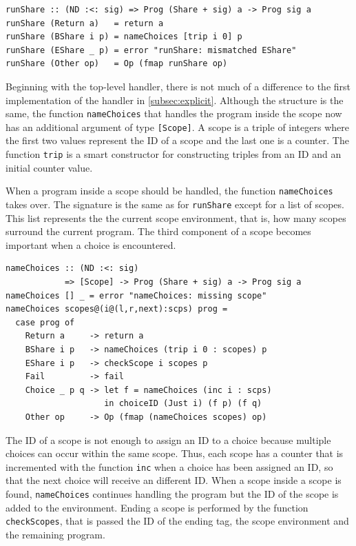 \documentclass[a4paper, 11pt, fleqn, twoside]{scrreprt}
\newcommand{\hinl}[1]{\texttt{#1}}
\begin{document}
\begin{verbatim}
runShare :: (ND :<: sig) => Prog (Share + sig) a -> Prog sig a
runShare (Return a)   = return a
runShare (BShare i p) = nameChoices [trip i 0] p
runShare (EShare _ p) = error "runShare: mismatched EShare"
runShare (Other op)   = Op (fmap runShare op)
\end{verbatim}

Beginning with the top-level handler, there is not much of a difference to the first implementation of the handler in \autoref{subsec:explicit}.
Although the structure is the same, the function \hinl{nameChoices} that handles the program inside the scope now has an additional argument of type \hinl{[Scope]}.
A scope is a triple of integers where the first two values represent the ID of a scope and the last one is a counter.
The function \hinl{trip} is a smart constructor for constructing triples from an ID and an initial counter value.

When a program inside a scope should be handled, the function \hinl{nameChoices} takes over.
The signature is the same as for \hinl{runShare} except for a list of scopes.
This list represents the the current scope environment, that is, how many scopes surround the current program.
The third component of a scope becomes important when a choice is encountered.

\begin{verbatim}
nameChoices :: (ND :<: sig)
            => [Scope] -> Prog (Share + sig) a -> Prog sig a
nameChoices [] _ = error "nameChoices: missing scope"
nameChoices scopes@(i@(l,r,next):scps) prog =
  case prog of
    Return a     -> return a
    BShare i p   -> nameChoices (trip i 0 : scopes) p
    EShare i p   -> checkScope i scopes p
    Fail         -> fail
    Choice _ p q -> let f = nameChoices (inc i : scps)
                    in choiceID (Just i) (f p) (f q)
    Other op     -> Op (fmap (nameChoices scopes) op)
\end{verbatim}

The ID of a scope is not enough to assign an ID to a choice because multiple choices can occur within the same scope.
Thus, each scope has a counter that is incremented with the function \hinl{inc} when a choice has been assigned an ID, so that the next choice will receive an different ID.
When a scope inside a scope is found, \hinl{nameChoices} continues handling the program but the ID of the scope is added to the environment.
Ending a scope is performed by the function \hinl{checkScopes}, that is passed the ID of the ending tag, the scope environment and the remaining program.
\end{document}
